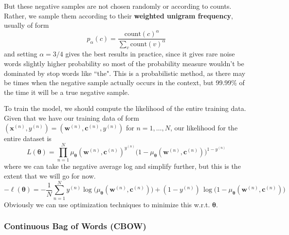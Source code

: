 \documentclass{article}
\begin{document}
      But these negative samples are not chosen randomly or according to counts. Rather, we sample them according to their \textbf{weighted unigram frequency}, usually of form 
      \[p_\alpha (c) = \frac{\mathrm{count}(c)^\alpha}{\sum_v \mathrm{count}(v)^\alpha}\]
      and setting $\alpha = 3/4$ gives the best results in practice, since it gives rare noise words slightly higher probability so most of the probability measure wouldn't be dominated by stop words like ``the". This is a probabilistic method, as there may be times when the negative sample actually occurs in the context, but 99.99\% of the time it will be a true negative sample. 

      To train the model, we should compute the likelihood of the entire training data. Given that we have our training data of form $(\mathbf{x}^{(n)}, y^{(n)}) = (\mathbf{w}^{(n)}, \mathbf{c}^{(n)}, y^{(n)})$ for $n = 1, \ldots, N$, our likelihood for the entire dataset is 
      \[L(\boldsymbol{\theta}) = \prod_{n=1}^N \mu_{\boldsymbol{\theta}} (\mathbf{w}^{(n)}, \mathbf{c}^{(n)})^{y^{(n)}} \big( 1 - \mu_{\boldsymbol{\theta}} (\mathbf{w}^{(n)}, \mathbf{c}^{(n)}) \big)^{1 - y^{(n)}} \]
      where we can take the negative average log and simplify further, but this is the extent that we will go for now. 
      \[- \ell (\boldsymbol{\theta}) = - \frac{1}{N} \sum_{n=1}^N y^{(n)} \log \big( \mu_{\boldsymbol{\theta}} (\mathbf{w}^{(n)}, \mathbf{c}^{(n)}) \big) + (1 - y^{(n)}) \, \log \big( 1 - \mu_{\boldsymbol{\theta}} (\mathbf{w}^{(n)} , \mathbf{c}^{(n)}) \big)\]
      Obviously we can use optimization techniques to minimize this w.r.t. $\boldsymbol{\theta}$. 

    \subsubsection{Continuous Bag of Words (CBOW)}
\end{document}
